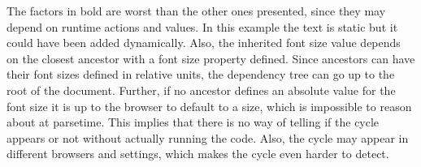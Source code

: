 \documentclass[a4paper,11pt]{kth-mag}
\newcommand{\code}[1]{\texttt{#1}}
\begin{document}
          The factors in bold are worst than the other ones presented, since they may depend on runtime actions and values.
          In this example the text is static but it could have been added dynamically.
          Also, the inherited font size value depends on the closest ancestor with a font size property defined.
          Since ancestors can have their font sizes defined in relative units, the dependency tree can go up to the root of the \gls{document}.
          Further, if no ancestor defines an absolute value for the font size it is up to the \gls{browser} to default to a size, which is impossible to reason about at parsetime.
          This implies that there is no way of telling if the cycle appears or not without actually running the code.
          Also, the cycle may appear in different \glspl{browser} and settings, which makes the cycle even harder to detect.
          
\end{document}
